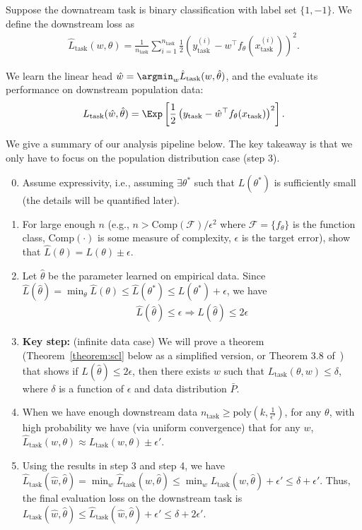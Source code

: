 Suppose the downatream task is binary classification with label set $\{1, -1\}$. We define the downstream loss as 
\begin{align}
	\hat{L}_{\text{task}}(w, \theta) = \frac{1}{n_{\text{task}}} \sum_{i=1}^{n_{\text{task}}} \frac{1}{2} \left(y^{(i)}_{\text{task}} - w^\top f_{{\theta}}(x^{(i)}_{\text{task}})\right)^2.
\end{align}

We learn the linear head $\hat{w} = \argmin_w \hat{L}_{\text{task}}(w, \hat{\theta})$, and the evaluate its performance on downstream population data:
\begin{align}
	L_{\text{task}}(\hat{w}, \hat{\theta}) = \Exp\left[\frac{1}{2} \left(y_{\text{task}} - \hat{w}^\top f_{{\theta}}(x_{\text{task}})\right)^2\right].
\end{align}

 We give a summary of our analysis pipeline below. The key takeaway is that we only have to focus on the population distribution case (step 3). 
\begin{enumerate}\setcounter{enumi}{-1}
\item{Assume expressivity, i.e., assuming $\exists \theta^*$ such that $L(\theta^*)$ is sufficiently small (the details will be quantified later).}
\item{For large enough $n$ (e.g., $n>\text{Comp}({\mathcal{F}})/\epsilon^2$ where ${\mathcal{F}}=\{f_\theta\}$ is the function class, $\text{Comp}(\cdot)$ is some measure of complexity, $\epsilon$ is the target error), show that $\hat{L}(\theta) = L(\theta) \pm \epsilon$.}
\item{Let $\hat{\theta}$ be the parameter learned on empirical data. Since $\hat{L}(\hat{\theta})=\min_{\theta}\hat{L}(\theta) \le \hat{L}(\theta^*) \le L(\theta^*)+\epsilon$, we have
\begin{align}
	\hat{L}(\hat{\theta})\le\epsilon \Rightarrow L(\hat{\theta}) \le 2\epsilon
\end{align}
}
\item{\textbf{Key step:} (infinite data case) We will prove a theorem (Theorem~\ref{theorem:scl} below as a simplified version, or Theorem 3.8 of~\citet{haochen2021provable}) that shows if $L(\hat{\theta})\le2\epsilon$, then there exists $w$ such that $L_{\text{task}}(\theta, w)\le \delta$, where $\delta$ is a function of $\epsilon$ and data distribution $\bar{P}$.}
\item{When we have enough downstream data $n_{\text{task}}\ge\text{poly}(k, \frac{1}{\epsilon'})$, for any $\theta$, with high probability we have (via uniform convergence) that for any $w$, 
$	\hat{L}_{\text{task}}(w, \theta) \approx L_{\text{task}}(w, \theta)\pm \epsilon'$. }
\item{Using the results in step 3 and step 4, we have $\hat{L}_{\text{task}}(\hat{w}, \hat{\theta}) = \min_{w} \hat{L}_{\text{task}}(w, \hat{\theta}) \le \min_w L_{\text{task}}(w, \hat{\theta}) + \epsilon' \le \delta + \epsilon'$. Thus, the final evaluation loss on the downstream task is $L_{\text{task}}(\hat{w}, \hat{\theta}) \le \hat{L}_{\text{task}}(\hat{w}, \hat{\theta}) +\epsilon' \le \delta + 2\epsilon'$. }
\end{enumerate}

